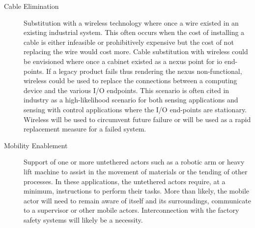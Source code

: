 \begin{description}
	
	\item[Cable Elimination] Substitution with a wireless technology where once a wire existed in an existing industrial system.  This often occurs when the cost of installing a cable is either infeasible or prohibitively expensive but the cost of not replacing the wire would cost more.  Cable substitution with wireless could be envisioned where once a cabinet existed as a nexus point for \gls{io} end-points.  If a legacy product fails thus rendering the nexus non-functional, wireless could be used to replace the connections between a computing device and the various I/O endpoints.  This scenario is often cited in industry as a high-likelihood scenario for both sensing applications and sensing with control applications where the I/O end-points are stationary.  Wireless will be used to circumvent future failure or will be used as a rapid replacement measure for a failed system.
	
	\item[Mobility Enablement] Support of one or more untethered actors such as a robotic arm or heavy lift machine to assist in the movement of materials or the tending of other processes.  In these applications, the untethered actors require, at a minimum, instructions to perform their tasks.  More than likely, the mobile actor will need to remain aware of itself and its surroundings, communicate to a supervisor or other mobile actors.  Interconnection with the factory safety systems will likely be a necessity.
	
\end{description}


